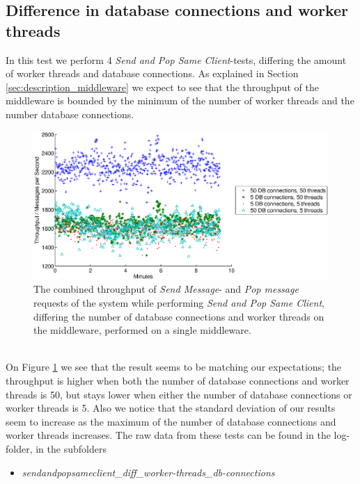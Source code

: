 \documentclass{article}
\begin{document}
        \subsection{Difference in database connections and worker threads}
            \label{sec:difference_in_dbcons_and_worker_threads}
            In this test we perform 4 \textit{Send and Pop Same Client}-tests, differing the amount of worker threads and database connections. As explained in Section \ref{sec:description_middleware} we expect to see that the throughput of the middleware is bounded by the minimum of the number of worker threads and the number database connections.

             \begin{figure}[H]
                 \centering
                 \centerline{\includegraphics[scale=0.50]{throughput_vs_dbconns}}
                 \caption{The combined throughput of \textit{Send Message}- and \textit{Pop message} requests of the system while performing \textit{Send and Pop Same Client}, differing the number of database connections and worker threads on the middleware, performed on a single middleware.}
                 \label{fig:throughput_vs_dbconns}
             \end{figure}
             ~\\
             On Figure \ref{fig:throughput_vs_dbconns} we see that the result seems to be matching our expectations; the throughput is higher when both the number of database connections and worker threads is 50, but stays lower when either the number of database connections or worker threads is 5. Also we notice that the standard deviation of our results seem to increase as the maximum of the number of database connections and worker threads increases.
            The raw data from these tests can be found in the log-folder, in the subfolders
            \begin{itemize}
                \item \textit{sendandpopsameclient\_diff\_worker-threads\_db-connections}
            \end{itemize}
            
\end{document}
